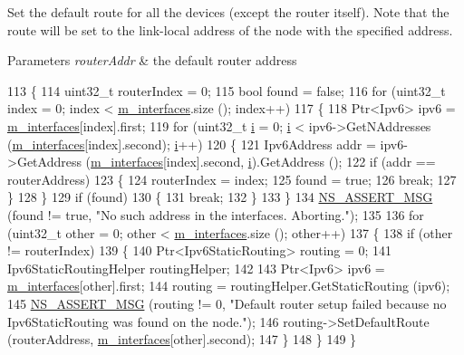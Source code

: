Set the default route for all the devices (except the router itself). Note that the route will be set to the link-\/local address of the node with the specified address. 


\begin{DoxyParams}{Parameters}
{\em router\+Addr} & the default router address \\
\hline
\end{DoxyParams}

\begin{DoxyCode}
113 \{
114   uint32\_t routerIndex = 0;
115   \textcolor{keywordtype}{bool} found = \textcolor{keyword}{false};
116   \textcolor{keywordflow}{for} (uint32\_t index = 0; index < \hyperlink{classns3_1_1Ipv6InterfaceContainer_a559846ada263de96a3a5d0408824712d}{m\_interfaces}.size (); index++)
117     \{
118       Ptr<Ipv6> ipv6 = \hyperlink{classns3_1_1Ipv6InterfaceContainer_a559846ada263de96a3a5d0408824712d}{m\_interfaces}[index].first;
119       \textcolor{keywordflow}{for} (uint32\_t \hyperlink{bernuolliDistribution_8m_a6f6ccfcf58b31cb6412107d9d5281426}{i} = 0; \hyperlink{bernuolliDistribution_8m_a6f6ccfcf58b31cb6412107d9d5281426}{i} < ipv6->GetNAddresses (\hyperlink{classns3_1_1Ipv6InterfaceContainer_a559846ada263de96a3a5d0408824712d}{m\_interfaces}[index].second); 
      \hyperlink{bernuolliDistribution_8m_a6f6ccfcf58b31cb6412107d9d5281426}{i}++)
120         \{
121           Ipv6Address addr = ipv6->GetAddress (\hyperlink{classns3_1_1Ipv6InterfaceContainer_a559846ada263de96a3a5d0408824712d}{m\_interfaces}[index].second, 
      \hyperlink{bernuolliDistribution_8m_a6f6ccfcf58b31cb6412107d9d5281426}{i}).GetAddress ();
122           \textcolor{keywordflow}{if} (addr == routerAddress)
123             \{
124               routerIndex = index;
125               found = \textcolor{keyword}{true};
126               \textcolor{keywordflow}{break};
127             \}
128         \}
129       \textcolor{keywordflow}{if} (found)
130         \{
131           \textcolor{keywordflow}{break};
132         \}
133     \}
134   \hyperlink{assert_8h_aff5ece9066c74e681e74999856f08539}{NS\_ASSERT\_MSG} (found != \textcolor{keyword}{true}, \textcolor{stringliteral}{"No such address in the interfaces. Aborting."});
135 
136   \textcolor{keywordflow}{for} (uint32\_t other = 0; other < \hyperlink{classns3_1_1Ipv6InterfaceContainer_a559846ada263de96a3a5d0408824712d}{m\_interfaces}.size (); other++)
137     \{
138       \textcolor{keywordflow}{if} (other != routerIndex)
139         \{
140           Ptr<Ipv6StaticRouting> routing = 0;
141           Ipv6StaticRoutingHelper routingHelper;
142 
143           Ptr<Ipv6> ipv6 = \hyperlink{classns3_1_1Ipv6InterfaceContainer_a559846ada263de96a3a5d0408824712d}{m\_interfaces}[other].first;
144           routing = routingHelper.GetStaticRouting (ipv6);
145           \hyperlink{assert_8h_aff5ece9066c74e681e74999856f08539}{NS\_ASSERT\_MSG} (routing != 0, \textcolor{stringliteral}{"Default router setup failed because no
       Ipv6StaticRouting was found on the node."});
146           routing->SetDefaultRoute (routerAddress, \hyperlink{classns3_1_1Ipv6InterfaceContainer_a559846ada263de96a3a5d0408824712d}{m\_interfaces}[other].second);
147         \}
148     \}
149 \}
\end{DoxyCode}


